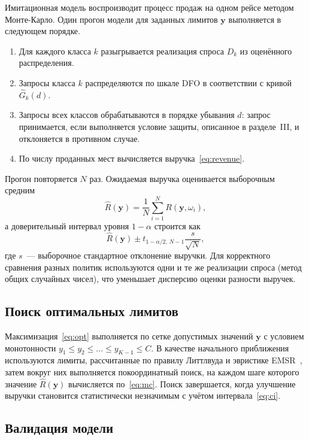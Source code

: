 \documentclass{misisarticle}
\begin{document}
Имитационная модель воспроизводит процесс продаж на одном рейсе методом Монте-Карло. Один прогон модели для заданных лимитов $\mathbf{y}$ выполняется в следующем порядке.
\begin{enumerate}[label=\arabic*)]
  \item Для каждого класса $k$ разыгрывается реализация спроса $D_k$ из оценённого распределения.
  \item Запросы класса $k$ распределяются по шкале DFO в соответствии с кривой $\hat{G}_k(d)$.
  \item Запросы всех классов обрабатываются в порядке убывания $d$: запрос принимается, если выполняется условие защиты, описанное в разделе~III, и отклоняется в противном случае.
  \item По числу проданных мест вычисляется выручка~\eqref{eq:revenue}.
\end{enumerate}

Прогон повторяется $N$ раз. Ожидаемая выручка оценивается выборочным средним
\begin{equation}
  \hat{R}(\mathbf{y}) = \frac{1}{N} \sum_{i=1}^{N} R(\mathbf{y}, \omega_i),
  \label{eq:mc}
\end{equation}
а доверительный интервал уровня $1-\alpha$ строится как
\begin{equation}
  \hat{R}(\mathbf{y}) \pm t_{1-\alpha/2,\,N-1} \frac{s}{\sqrt{N}},
  \label{eq:ci}
\end{equation}
где $s$~--- выборочное стандартное отклонение выручки. Для корректного сравнения разных политик используются одни и те же реализации спроса (метод общих случайных чисел), что уменьшает дисперсию оценки разности выручек.

\subsection{Поиск оптимальных лимитов}

Максимизация~\eqref{eq:opt} выполняется по сетке допустимых значений $\mathbf{y}$ с условием монотонности $y_1 \le y_2 \le \dots \le y_{K-1} \le C$. В качестве начального приближения используются лимиты, рассчитанные по правилу Литтлвуда и эвристике EMSR~\cite{littlewood1972, belobaba1987}, затем вокруг них выполняется покоординатный поиск, на каждом шаге которого значение $\hat{R}(\mathbf{y})$ вычисляется по~\eqref{eq:mc}. Поиск завершается, когда улучшение выручки становится статистически незначимым с учётом интервала~\eqref{eq:ci}.

\subsection{Валидация модели}
\end{document}
